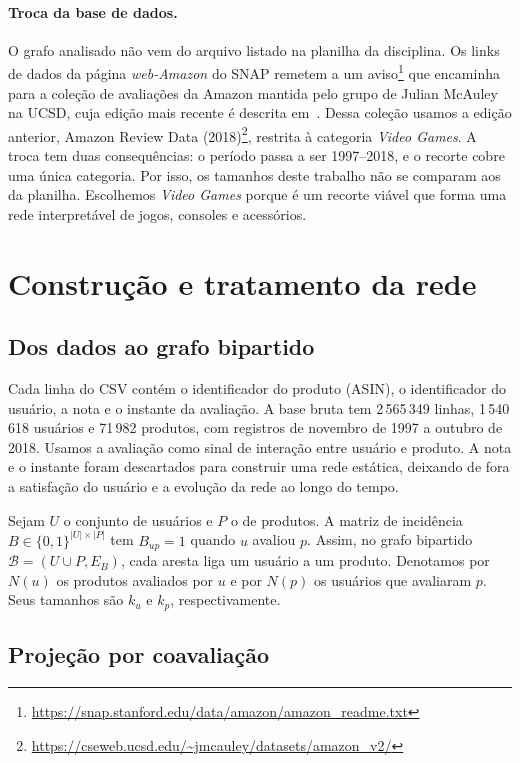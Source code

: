 \documentclass[sigconf,nonacm]{webmedia}
\begin{document}
\paragraph{Troca da base de dados.}
O grafo analisado não vem do arquivo listado na planilha da
disciplina. Os links de dados da página \emph{web-Amazon} do SNAP
remetem a um aviso\footnote{\url{https://snap.stanford.edu/data/amazon/amazon_readme.txt}} que encaminha para a coleção de avaliações da Amazon mantida pelo
grupo de Julian McAuley na UCSD, cuja edição mais recente é descrita
em~\cite{hou2024}. Dessa coleção usamos a edição anterior, Amazon
Review Data (2018)\footnote{\url{https://cseweb.ucsd.edu/~jmcauley/datasets/amazon_v2/}},
restrita à categoria \emph{Video Games}. A troca tem duas consequências: o período
passa a ser 1997--2018, e o recorte cobre uma única categoria. Por
isso, os tamanhos deste trabalho não se comparam aos da planilha.
Escolhemos \emph{Video Games} porque é um recorte viável que forma
uma rede interpretável de jogos, consoles e acessórios.

\section{Construção e tratamento da rede}

\subsection{Dos dados ao grafo bipartido}

Cada linha do CSV contém o identificador do produto (ASIN), o
identificador do usuário, a nota e o instante da avaliação. A base
bruta tem 2\,565\,349 linhas, 1\,540\,618 usuários e 71\,982
produtos, com registros de novembro de 1997 a outubro de 2018.
Usamos a avaliação como sinal de interação entre usuário e produto. A nota e o instante foram descartados para construir uma rede
estática, deixando de fora a satisfação do usuário e a evolução da
rede ao longo do tempo.

Sejam \(U\) o conjunto de usuários e \(P\) o de produtos.
A matriz de incidência \(B\in\{0,1\}^{|U|\times|P|}\) tem
\(B_{up}=1\) quando \(u\) avaliou \(p\). Assim, no grafo bipartido
\(\mathcal B=(U\cup P,E_B)\), cada aresta liga um usuário a um
produto. Denotamos por \(N(u)\) os produtos avaliados por \(u\) e
por \(N(p)\) os usuários que avaliaram \(p\). Seus tamanhos são
\(k_u\) e \(k_p\), respectivamente.

\subsection{Projeção por coavaliação}
\end{document}
